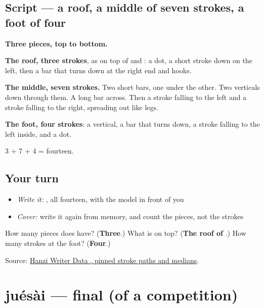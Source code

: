 \subsection*{Script — a roof, a middle of seven strokes, a foot of four}

\begin{quote}
\end{quote}

\textbf{Three pieces, top to bottom.}

\textbf{The roof, three strokes}, as on top of  and : a dot, a short stroke down on the left, then a bar that turns down at the right end and hooks.

\textbf{The middle, seven strokes.} Two short bars, one under the other. Two verticals down through them. A long bar across. Then a stroke falling to the left and a stroke falling to the right, spreading out like legs.

\textbf{The foot, four strokes}: a vertical, a bar that turns down, a stroke falling to the left inside, and a dot.

3 + 7 + 4 = fourteen.

\subsection*{Your turn}
\begin{itemize}
\raggedright
  \item \emph{Write it:} , all fourteen, with the model in front of you
  \item \emph{Cover:} write it again from memory, and count the pieces, not the strokes
\end{itemize}

\begin{tcolorbox}[breakable,colback=teal!4,colframe=teal!35!black,title={Before you move on}]
How many pieces does  have? (\textbf{Three}.) What is on top? (\textbf{The roof of }.) How many strokes at the foot? (\textbf{Four}.)

Source: \href{https://raw.githubusercontent.com/chanind/hanzi-writer-data/68d10a4b21150cae5e1ebbd223eed289cf32d90c/data/\%E8\%B5\%9B.json}{Hanzi Writer Data , pinned stroke paths and medians}.
\end{tcolorbox}
\section[juésài]{juésài — final (of a competition)}

